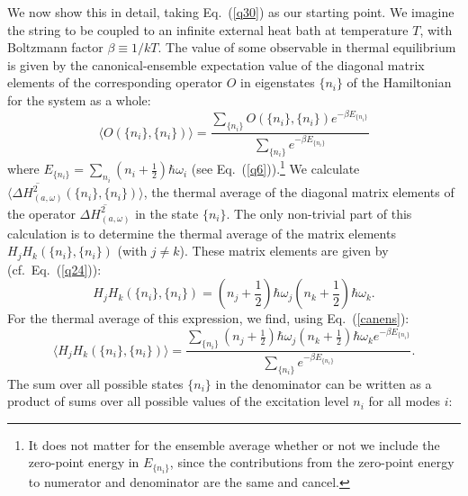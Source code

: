 \documentclass[12pt]{elsart}
\begin{document}
{We now show this in detail,  taking Eq.\ (\ref{q30}) as our starting point. We imagine the string to be coupled to an infinite external heat bath at temperature
$T$, with Boltzmann factor $\beta \equiv 1/kT$. The value of some observable in thermal equilibrium is given by the canonical-ensemble expectation value of the diagonal matrix elements of the corresponding operator $O$ in eigenstates $\{ n_i \}$ of the Hamiltonian for the system as a whole:
\begin{equation}
  \langle O(\{ n_i \}, \{ n_i \}) \rangle = \frac{ \displaystyle{ \sum_{ \{ n_i \} } } O(\{ n_i \}, \{ n_i \}) 
  e^{ \displaystyle{ -\beta E_{ \{ n_i \}}}}}{ \displaystyle{ \sum_{\{ n_i \}}} e^{ \displaystyle{ -\beta E_{\{ n_i \}}}}}
  \label{canens}
  \end{equation}
 where $E_{ \{ n_i \}} = \sum_{n_i} \left( n_i + \frac{1}{2} \right) \hbar \omega_i$ (see Eq.\  (\ref{q6})).\footnote{It does not matter for the ensemble average whether or not we include the zero-point energy in $E_{ \{ n_i \}}$, since the contributions from the zero-point energy  to numerator and  denominator are the same and cancel.} We calculate $\langle \overline{\Delta H_{(a, \omega)}^2} (\{ n_i \}, \{ n_i \}) \rangle$, the thermal average of the diagonal matrix elements of the operator $\overline{\Delta H_{(a, \omega)}^2}$ in the state $\{ n_i \}$. The only non-trivial part of this calculation is to determine the thermal average of the matrix elements $H_j H_k(\{ n_i \}, \{ n_i \})$ (with $j \neq k$). These matrix elements are given by (cf.\ Eq.\ (\ref{q24})):
\begin{equation}
H_j H_k (\{ n_i \}, \{ n_i \}) = \left( n_j + \frac{1}{2} \right) \hbar \omega_j  \left( n_k + \frac{1}{2} \right) \hbar \omega_k.
\label{q32}
\end{equation}
For the thermal average of this expression, we find, using Eq.\ (\ref{canens}):
\begin{equation}
\langle H_j H_k (\{ n_i \}, \{ n_i \}) \rangle =  \frac{ \displaystyle{ \sum_{ \{ n_{i} \} } }
\left(n_{j}+ \displaystyle{ \frac{1}{2}} \right)\hbar\omega_{j}
\left(n_{k}+ \displaystyle{ \frac{1}{2}} \right)\hbar\omega_{k}
e^{ \displaystyle{ -\beta E_{ \{ n_{i} \} }} }}{\displaystyle { \sum_{ \{ n_{i} \} } } 
e^{ \displaystyle{  -\beta E_{\{ n_{i} \}} } } }.
\label{q33} 
\end{equation}
The sum over all possible states $\{ n_i \}$ in the denominator can be written as a product of sums over all possible values of the excitation level $n_i$ for all modes $i$:
\begin{equation}

\end{equation}}
\end{document}
